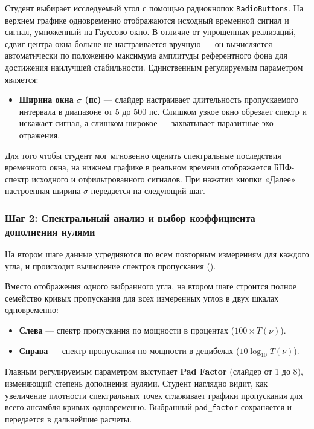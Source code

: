 Студент выбирает исследуемый угол с помощью радиокнопок \texttt{RadioButtons}. На верхнем графике одновременно отображаются исходный временной сигнал и сигнал, умноженный на Гауссово окно. В отличие от упрощенных реализаций, сдвиг центра окна больше не настраивается вручную — он вычисляется автоматически по положению максимума амплитуды референтного фона для достижения наилучшей стабильности. Единственным регулируемым параметром является:
\begin{itemize}
    \item \textbf{Ширина окна $\sigma$ (пс)} — слайдер настраивает длительность пропускаемого интервала в диапазоне от 5 до 500 пс. Слишком узкое окно обрезает спектр и искажает сигнал, а слишком широкое — захватывает паразитные эхо-отражения.
\end{itemize}

Для того чтобы студент мог мгновенно оценить спектральные последствия временного окна, на нижнем графике в реальном времени отображается БПФ-спектр исходного и отфильтрованного сигналов. При нажатии кнопки «Далее» настроенная ширина $\sigma$ передается на следующий шаг.


\subsubsection{Шаг 2: Спектральный анализ и выбор коэффициента дополнения нулями}

На втором шаге данные усредняются по всем повторным измерениям для каждого угла, и происходит вычисление спектров пропускания ().

Вместо отображения одного выбранного угла, на втором шаге строится полное семейство кривых пропускания для всех измеренных углов в двух шкалах одновременно:
\begin{itemize}
    \item \textbf{Слева} — спектр пропускания по мощности в процентах ($100 \times T(\nu)$).
    \item \textbf{Справа} — спектр пропускания по мощности в децибелах ($10 \log_{10} T(\nu)$).
\end{itemize}

Главным регулируемым параметром выступает \textbf{Pad Factor} (слайдер от 1 до 8), изменяющий степень дополнения нулями. Студент наглядно видит, как увеличение плотности спектральных точек сглаживает графики пропускания для всего ансамбля кривых одновременно. Выбранный \texttt{pad\_factor} сохраняется и передается в дальнейшие расчеты.

